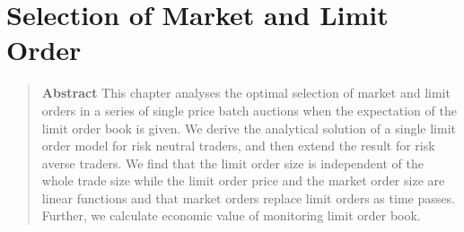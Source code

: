 


\chapter{Selection of Market and Limit Order}\label{chap_l}


\def\va{v_{1a}-\frac{p_1}{a_1}}
\def\vm{v_{1m}-\frac{p_1}{a_1}}

\def\v1{v_1-\frac{p_1}{a_1}}
\def\u1{u_1-\frac{p_1}{a_1}}
\def\pa{\frac{p_1}{a_1}}

\def\px{\phi_x}
\def\Px{\Phi_x}
\def\pmx{\phi_{-x}}
\def\Pmx{\Phi_{-x}}
\def\py{\phi_y}
\def\Py{\Phi_y}
\def\pmy{\phi_{-y}}
\def\Pmy{\Phi_{-y}}
\def\gx{G_x}
\def\gmx{G_{-x}}
\def\gy{G_y}
\def\gmy{G_{-y}}
\def\p0{\phi_0}
\def\sgn{\mbox{sgn}}




\begin{quote}
{\bf Abstract} \quad This chapter analyses the optimal selection of market and limit orders in a series of single price batch auctions when the expectation of the limit order book is given.  We derive the analytical solution of a single limit order model for risk neutral traders, and then extend the result for risk averse traders.  We find that the limit order size is independent of the whole trade size while the limit order price and the market order size are linear functions and that market orders replace limit orders as time passes.  Further, we calculate economic value of monitoring limit order book.

\end{quote}

